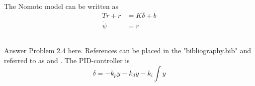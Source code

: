 The Nomoto model can be written as
\begin{equation}
\label{eq:nomoto}
	\begin{aligned}
		T \dot{r} + r &= K \delta + b \\
		\dot{\psi} &= r
	\end{aligned}
\end{equation}

\subsection{}
Answer Problem 2.4 here.  References can be placed in the "bibliography.bib" and referred to as \cite{Fossen2011} and \cite{Fjellstad1994857}. The PID-controller is
\begin{equation}
	\delta = -k_p y - k_d \dot{y} - k_i \int y
\end{equation}
